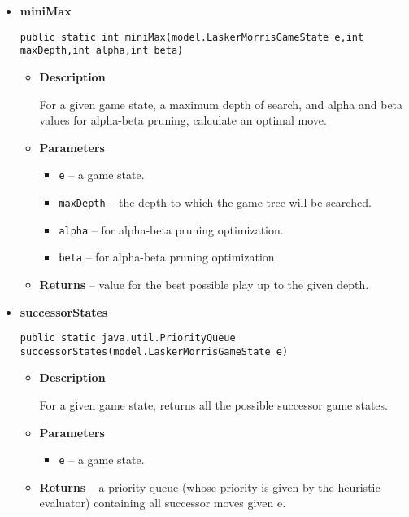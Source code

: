 \documentclass[11pt,a4paper]{report}
\begin{document}
{{{{{{{\begin{itemize}
{\begin{itemize}
{For a given turn, compute the best possible play.
}
\item{
{\bf  Parameters}
  \begin{itemize}
   \item{
\texttt{e} -- a game state.}
  \end{itemize}
}%
\item{{\bf  Returns} -- 
the game state to be played in the given turn. 
}%
\end{itemize}
}%
\item{ 
{\bf  miniMax}\\
\begin{lstlisting}[frame=none]
public static int miniMax(model.LaskerMorrisGameState e,int maxDepth,int alpha,int beta)\end{lstlisting} %
\begin{itemize}
\item{
{\bf  Description}

For a given game state, a maximum depth of search, and alpha and beta values for alpha-beta pruning, calculate an optimal move.
}
\item{
{\bf  Parameters}
  \begin{itemize}
   \item{
\texttt{e} -- a game state.}
   \item{
\texttt{maxDepth} -- the depth to which the game tree will be searched.}
   \item{
\texttt{alpha} -- for alpha-beta pruning optimization.}
   \item{
\texttt{beta} -- for alpha-beta pruning optimization.}
  \end{itemize}
}%
\item{{\bf  Returns} -- 
value for the best possible play up to the given depth. 
}%
\end{itemize}
}%
\item{ 
{\bf  successorStates}\\
\begin{lstlisting}[frame=none]
public static java.util.PriorityQueue successorStates(model.LaskerMorrisGameState e)\end{lstlisting} %
\begin{itemize}
\item{
{\bf  Description}

For a given game state, returns all the possible successor game states.
}
\item{
{\bf  Parameters}
  \begin{itemize}
   \item{
\texttt{e} -- a game state.}
  \end{itemize}
}%
\item{{\bf  Returns} -- 
a priority queue (whose priority is given by the heuristic evaluator) containing all successor moves given e. 
}%
\end{itemize}
}%
\end{itemize}
}
}
}}}}}
\end{document}
